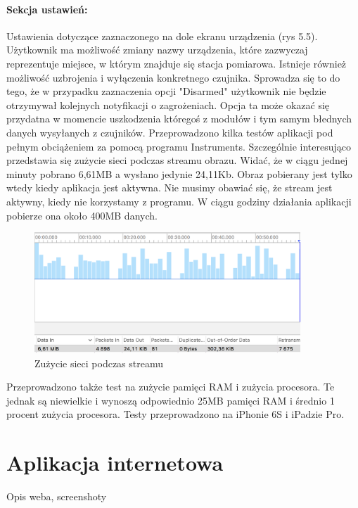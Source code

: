 \paragraph{Sekcja ustawień:}
Ustawienia dotyczące zaznaczonego na dole ekranu urządzenia (rys 5.5). Użytkownik ma możliwość zmiany nazwy urządzenia, które zazwyczaj reprezentuje miejsce, w którym znajduje się stacja pomiarowa. Istnieje również możliwość uzbrojenia i wyłączenia konkretnego czujnika. Sprowadza się to do tego, że w przypadku zaznaczenia opcji "Disarmed" użytkownik nie będzie otrzymywał kolejnych notyfikacji o zagrożeniach. Opcja ta może okazać się przydatna w momencie uszkodzenia któregoś z modułów i tym samym błednych danych wysyłanych z czujników.
Przeprowadzono kilka testów aplikacji pod pełnym obciążeniem za pomocą programu Instruments. Szczególnie interesująco przedstawia się zużycie sieci podczas streamu obrazu. Widać, że w ciągu jednej minuty pobrano 6,61MB a wysłano jedynie 24,11Kb. Obraz pobierany jest tylko wtedy kiedy aplikacja jest aktywna. Nie musimy obawiać się, że stream jest aktywny, kiedy nie korzystamy z programu. W ciągu godziny działania aplikacji pobierze ona około 400MB danych.
\begin{figure}[h]
	\centering
	\includegraphics[width=10cm]{networkUsage}
	\caption{Zużycie sieci podczas streamu}
\end{figure}
Przeprowadzono także test na zużycie pamięci RAM i zużycia procesora. Te jednak są niewielkie i wynoszą odpowiednio 25MB pamięci RAM i średnio 1 procent zużycia procesora.
Testy przeprowadzono na iPhonie 6S i iPadzie Pro.




\section*{Aplikacja internetowa}

Opis weba, screenshoty